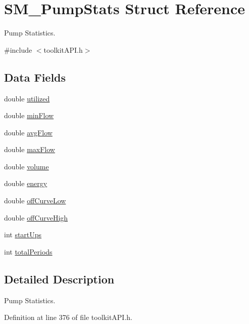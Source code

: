 \hypertarget{struct_s_m___pump_stats}{}\section{S\+M\+\_\+\+Pump\+Stats Struct Reference}
\label{struct_s_m___pump_stats}


Pump Statistics.  




{\ttfamily \#include $<$toolkit\+A\+P\+I.\+h$>$}

\subsection*{Data Fields}
\begin{DoxyCompactItemize}
\item 
double \hyperlink{struct_s_m___pump_stats_a200b170f07df6efeaa5aad98ef34a488}{utilized}
\item 
double \hyperlink{struct_s_m___pump_stats_a940e07cc7a1b5085370b23e9846230bb}{min\+Flow}
\item 
double \hyperlink{struct_s_m___pump_stats_afcd256ffd7ec0ed557f6dc62d9b83a52}{avg\+Flow}
\item 
double \hyperlink{struct_s_m___pump_stats_a4d84bca5454f3903c44fe865e44674f5}{max\+Flow}
\item 
double \hyperlink{struct_s_m___pump_stats_a9bc498ccac8db41438f855f5dd3f4c05}{volume}
\item 
double \hyperlink{struct_s_m___pump_stats_ac002779c383d2cc783e881f94449de66}{energy}
\item 
double \hyperlink{struct_s_m___pump_stats_affcf9c914facbda0b5007041aded7f09}{off\+Curve\+Low}
\item 
double \hyperlink{struct_s_m___pump_stats_a54bac8a593e64e581a2347b8ee12f51e}{off\+Curve\+High}
\item 
int \hyperlink{struct_s_m___pump_stats_a7499d03edd943b9f751b6ca6527abca5}{start\+Ups}
\item 
int \hyperlink{struct_s_m___pump_stats_a60fffeca33e0487e4b7cac3898b2cf05}{total\+Periods}
\end{DoxyCompactItemize}


\subsection{Detailed Description}
Pump Statistics. 

Definition at line 376 of file toolkit\+A\+P\+I.\+h.



